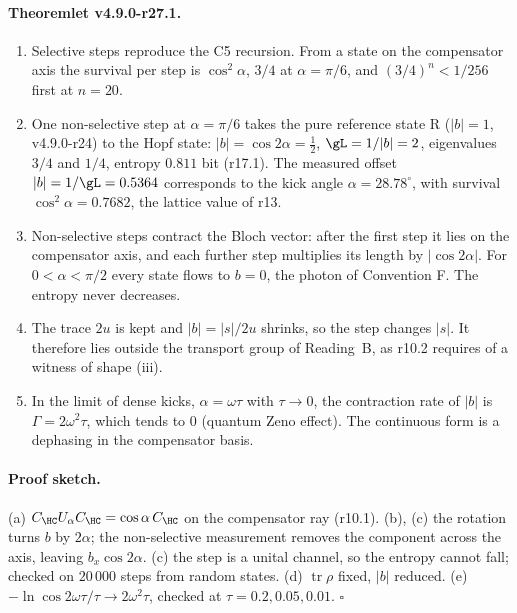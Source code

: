 \paragraph{Theoremlet v4.9.0-r27.1.}
\begin{enumerate}[leftmargin=2em]
\item[(a)] Selective steps reproduce the C5 recursion.  From a state on the compensator axis the survival per step is \(\cos^2\alpha\),
\(3/4\) at \(\alpha=\pi/6\), and \((3/4)^n<1/256\) first at \(n=20\).
\item[(b)] One non-selective step at \(\alpha=\pi/6\) takes the pure reference state R (\(|b|=1\), v4.9.0-r24) to the Hopf state:
\(|b|=\cos2\alpha=\tfrac12\), \(\gL=1/|b|=2\), eigenvalues \(3/4\) and \(1/4\), entropy \(0.811\) bit (r17.1).  The measured offset
\(|b|=1/\gL=0.5364\) corresponds to the kick angle \(\alpha=28.78^\circ\), with survival \(\cos^2\alpha=0.7682\), the lattice value of r13.
\item[(c)] Non-selective steps contract the Bloch vector: after the first step it lies on the compensator axis, and each further
step multiplies its length by \(|\cos2\alpha|\).  For \(0<\alpha<\pi/2\) every state flows to \(b=0\), the photon of Convention F.  The
entropy never decreases.
\item[(d)] The trace \(2u\) is kept and \(|b|=|s|/2u\) shrinks, so the step changes \(|s|\).  It therefore lies outside the transport
group of Reading~B, as r10.2 requires of a witness of shape (iii).
\item[(e)] In the limit of dense kicks, \(\alpha=\omega\tau\) with \(\tau\to0\), the contraction rate of \(|b|\) is
\(\Gamma=2\omega^2\tau\), which tends to \(0\) (quantum Zeno effect).  The continuous form is a dephasing in the compensator basis.
\end{enumerate}

\paragraph{Proof sketch.}
(a) \(C_{\HC}U_\alpha C_{\HC}=\cos\alpha\,C_{\HC}\) on the compensator ray (r10.1).  (b), (c) the rotation turns \(b\) by \(2\alpha\); the
non-selective measurement removes the component across the axis, leaving \(b_x\cos2\alpha\).  (c) the step is a unital channel, so the
entropy cannot fall; checked on \(20\,000\) steps from random states.  (d) \(\operatorname{tr}\rho\) fixed, \(|b|\) reduced.
(e) \(-\ln\cos2\omega\tau/\tau\to2\omega^2\tau\), checked at \(\tau=0.2,0.05,0.01\).  \(\square\)

